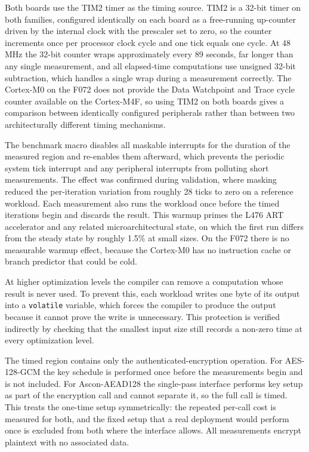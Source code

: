 Both boards use the TIM2 timer as the timing source.
TIM2 is a 32-bit timer on both families, configured identically on each board as
a free-running up-counter driven by the internal clock with the prescaler set to
zero, so the counter increments once per processor clock cycle and one tick
equals one cycle.
At 48\,MHz the 32-bit counter wraps approximately every 89 seconds, far longer
than any single measurement, and all elapsed-time computations use unsigned
32-bit subtraction, which handles a single wrap during a measurement correctly.
The Cortex-M0 on the F072 does not provide the Data Watchpoint and Trace cycle
counter available on the Cortex-M4F, so using TIM2 on both boards gives a
comparison between identically configured peripherals rather than between two
architecturally different timing mechanisms.

The benchmark macro disables all maskable interrupts for the duration of the
measured region and re-enables them afterward, which prevents the periodic
system tick interrupt and any peripheral interrupts from polluting short
measurements.
The effect was confirmed during validation, where masking reduced the
per-iteration variation from roughly 28 ticks to zero on a reference workload.
Each measurement also runs the workload once before the timed iterations begin
and discards the result.
This warmup primes the L476 ART accelerator and any related microarchitectural
state, on which the first run differs from the steady state by roughly 1.5\% at
small sizes.
On the F072 there is no measurable warmup effect, because the Cortex-M0 has no
instruction cache or branch predictor that could be cold.

At higher optimization levels the compiler can remove a computation whose result
is never used.
To prevent this, each workload writes one byte of its output into a
\texttt{volatile} variable, which forces the compiler to produce the output
because it cannot prove the write is unnecessary.
This protection is verified indirectly by checking that the smallest input size
still records a non-zero time at every optimization level.

The timed region contains only the authenticated-encryption operation.
For AES-128-GCM the key schedule is performed once before the measurements begin
and is not included.
For Ascon-AEAD128 the single-pass interface performs key setup as part of the
encryption call and cannot separate it, so the full call is timed.
This treats the one-time setup symmetrically: the repeated per-call cost is
measured for both, and the fixed setup that a real deployment would perform once
is excluded from both where the interface allows.
All measurements encrypt plaintext with no associated data.

